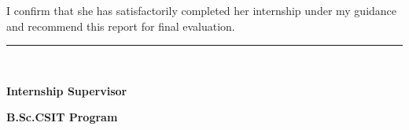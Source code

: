 I confirm that she has satisfactorily completed her internship under my guidance and recommend this report for final evaluation.

\vspace{47.8pt}
\vspace{13.8pt}
\vspace{13.45pt}
\noindent\rule{1.91in}{2.25pt}
\vspace{13pt}

\textbf{\fontsize{12}{14.5}\selectfont \SupervisorTitle\ \SupervisorName}\par
\vspace{5.3pt}
\textbf{\fontsize{12}{14.5}\selectfont Internship Supervisor}\par
\vspace{5.45pt}
\textbf{\fontsize{12}{14.5}\selectfont B.Sc.CSIT Program}\par
